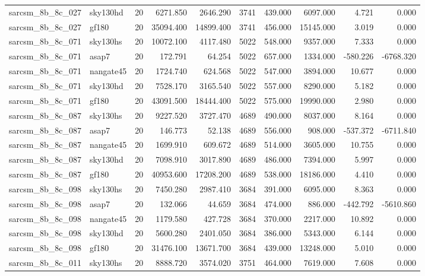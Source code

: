 \begin{tabular}{llrrrrrrrr}
sarcsm\_8b\_8c\_027 & sky130hd & 20 & 6271.850 & 2646.290 & 3741 & 439.000 & 6097.000 & 4.721 & 0.000 \\
sarcsm\_8b\_8c\_027 & gf180 & 20 & 35094.400 & 14899.400 & 3741 & 456.000 & 15145.000 & 3.019 & 0.000 \\
sarcsm\_8b\_8c\_071 & sky130hs & 20 & 10072.100 & 4117.480 & 5022 & 548.000 & 9357.000 & 7.333 & 0.000 \\
sarcsm\_8b\_8c\_071 & asap7 & 20 & 172.791 & 64.254 & 5022 & 657.000 & 1334.000 & -580.226 & -6768.320 \\
sarcsm\_8b\_8c\_071 & nangate45 & 20 & 1724.740 & 624.568 & 5022 & 547.000 & 3894.000 & 10.677 & 0.000 \\
sarcsm\_8b\_8c\_071 & sky130hd & 20 & 7528.170 & 3165.540 & 5022 & 557.000 & 8290.000 & 5.182 & 0.000 \\
sarcsm\_8b\_8c\_071 & gf180 & 20 & 43091.500 & 18444.400 & 5022 & 575.000 & 19990.000 & 2.980 & 0.000 \\
sarcsm\_8b\_8c\_087 & sky130hs & 20 & 9227.520 & 3727.470 & 4689 & 490.000 & 8037.000 & 8.164 & 0.000 \\
sarcsm\_8b\_8c\_087 & asap7 & 20 & 146.773 & 52.138 & 4689 & 556.000 & 908.000 & -537.372 & -6711.840 \\
sarcsm\_8b\_8c\_087 & nangate45 & 20 & 1699.910 & 609.672 & 4689 & 514.000 & 3605.000 & 10.755 & 0.000 \\
sarcsm\_8b\_8c\_087 & sky130hd & 20 & 7098.910 & 3017.890 & 4689 & 486.000 & 7394.000 & 5.997 & 0.000 \\
sarcsm\_8b\_8c\_087 & gf180 & 20 & 40953.600 & 17208.200 & 4689 & 538.000 & 18186.000 & 4.410 & 0.000 \\
sarcsm\_8b\_8c\_098 & sky130hs & 20 & 7450.280 & 2987.410 & 3684 & 391.000 & 6095.000 & 8.363 & 0.000 \\
sarcsm\_8b\_8c\_098 & asap7 & 20 & 132.066 & 44.659 & 3684 & 474.000 & 886.000 & -442.792 & -5610.860 \\
sarcsm\_8b\_8c\_098 & nangate45 & 20 & 1179.580 & 427.728 & 3684 & 370.000 & 2217.000 & 10.892 & 0.000 \\
sarcsm\_8b\_8c\_098 & sky130hd & 20 & 5600.280 & 2401.050 & 3684 & 386.000 & 5343.000 & 6.144 & 0.000 \\
sarcsm\_8b\_8c\_098 & gf180 & 20 & 31476.100 & 13671.700 & 3684 & 439.000 & 13248.000 & 5.010 & 0.000 \\
sarcsm\_8b\_8c\_011 & sky130hs & 20 & 8888.720 & 3574.020 & 3751 & 464.000 & 7619.000 & 7.608 & 0.000 \\

\end{tabular}
